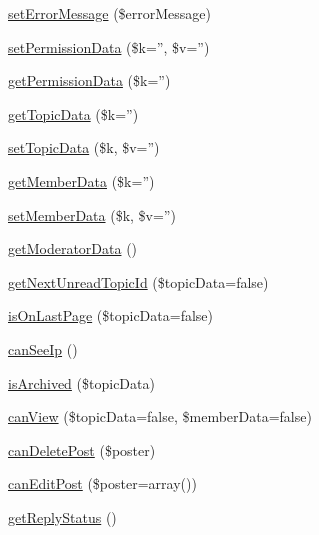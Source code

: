 \begin{DoxyCompactItemize}
\item 
\hyperlink{classapp__forums__classes__topics_ade45257a25c7924dcc04cec5cb1af70f}{set\-Error\-Message} (\$error\-Message)
\item 
\hyperlink{classapp__forums__classes__topics_ac0454c41b4e335fe0aa8f8f279d7ae84}{set\-Permission\-Data} (\$k='', \$v='')
\item 
\hyperlink{classapp__forums__classes__topics_a89348ddfcbe30ec6cf04b346bb8b823a}{get\-Permission\-Data} (\$k='')
\item 
\hyperlink{classapp__forums__classes__topics_ad03482aea1bc3a52271d144fa029e3e8}{get\-Topic\-Data} (\$k='')
\item 
\hyperlink{classapp__forums__classes__topics_aa1c6fbef21ae7c98a885d074c119f4d1}{set\-Topic\-Data} (\$k, \$v='')
\item 
\hyperlink{classapp__forums__classes__topics_a8ad42a7e0037618c849a3cb74fdf4291}{get\-Member\-Data} (\$k='')
\item 
\hyperlink{classapp__forums__classes__topics_aed5b5b4099e67fd6d385ab2c8aab8315}{set\-Member\-Data} (\$k, \$v='')
\item 
\hyperlink{classapp__forums__classes__topics_aa01414f79c088d6280f86990cdd2c16d}{get\-Moderator\-Data} ()
\item 
\hyperlink{classapp__forums__classes__topics_acb7dec594d20db33aa16962fe4363c3d}{get\-Next\-Unread\-Topic\-Id} (\$topic\-Data=false)
\item 
\hyperlink{classapp__forums__classes__topics_a73e81046fa21dfb869219c7245ea9f4b}{is\-On\-Last\-Page} (\$topic\-Data=false)
\item 
\hyperlink{classapp__forums__classes__topics_af971961c7c02cb8a5a82e14d8ad99133}{can\-See\-Ip} ()
\item 
\hyperlink{classapp__forums__classes__topics_ace710cd76c17f958bee9fdb6cab05518}{is\-Archived} (\$topic\-Data)
\item 
\hyperlink{classapp__forums__classes__topics_ad6045406cb646864f7047c2fdb2b15cf}{can\-View} (\$topic\-Data=false, \$member\-Data=false)
\item 
\hyperlink{classapp__forums__classes__topics_acd40fd6d4c07113e617bd9066bcdd1ad}{can\-Delete\-Post} (\$poster)
\item 
\hyperlink{classapp__forums__classes__topics_a34f648ba04f0a965f45b550594c76013}{can\-Edit\-Post} (\$poster=array())
\item 
\hyperlink{classapp__forums__classes__topics_abcf4c9adc4953f1ac35af06fbbfe9d90}{get\-Reply\-Status} ()
\item 

\end{DoxyCompactItemize}
